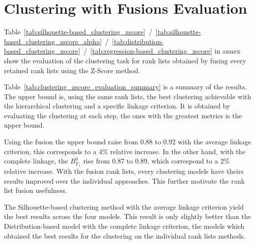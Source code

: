\section{Clustering with Fusions Evaluation}

Table~\ref{tab:silhouette-based_clustering_zscore}~/~\ref{tab:silhouette-based_clustering_zscore_alpha}~/~\ref{tab:distribution-based_clustering_zscore}~/~\ref{tab:regression-based_clustering_zscore} in annex show the evaluation of the clustering task for rank lists obtained by fusing every retained rank lists using the Z-Score method.

Table~\ref{tab:clustering_zscore_evaluation_summary} is a summary of the results.
The upper bound is, using the same rank lists, the best clustering achievable with the hierarchical clustering and a specific linkage criterion.
It is obtained by evaluating the clustering at each step, the ones with the greatest metrics is the upper bound.

Using the fusion the upper bound raise from 0.88 to 0.92 with the average linkage criterion, this corresponds to a 4\% relative increase.
In the other hand, with the complete linkage, the $B^{3}_{F_1}$ rise from 0.87 to 0.89, which correspond to a 2\% relative increase.
With the fusion rank lists, every clustering models have theirs results improved over the individual approaches.
This further motivate the rank list fusion usefulness.

The Silhouette-based clustering method with the average linkage criterion yield the best results across the four models.
This result is only slightly better than the Distribution-based model with the complete linkage criterion, the models which obtained the best results for the clustering on the individual rank lists methods.

\begin{table}[t]
  \centering
  \caption{Retained rank lists Mean $B^{3}_{F_1}$/$r_{diff}$ for each corpus pair}
  \label{tab:clustering_zscore_evaluation_summary}
\end{table}
